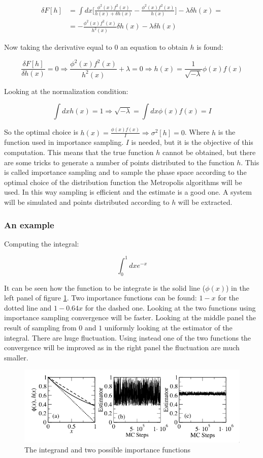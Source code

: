 	\begin{align*}
		\delta F[h] &= \int dx\biggl[\frac{\phi^2(x)f^2(x)}{h(x) + \delta h(x)} - \frac{\phi^2(x)f^2(x)}{h(x)}\biggr]-\lambda\delta h(x)=\\
								&=-\frac{\phi^2(x)f^2(x)}{h^2(x)}\delta h(x)-\lambda\delta h(x)
	\end{align*}

	Now taking the derivative equal to $0$ an equation to obtain $h$ is found:

	$$\frac{\delta F[h]}{\delta h(x)} = 0\Rightarrow\frac{\phi^2(x)f^2(x)}{h^2(x)}+\lambda = 0\Rightarrow h(x) = \frac{1}{\sqrt{-\lambda}}\phi(x)f(x)$$

	Looking at the normalization condition:

	$$\int dxh(x) = 1\Rightarrow\sqrt{-\lambda} = \int dx\phi(x)f(x) = I$$

	So the optimal choice is $h(x) = \frac{\phi(x)f(x)}{I}\Rightarrow \sigma^2[h] =0$.
	Where $h$ is the function used in importance sampling.
	$I$ is needed, but it is the objective of this computation.
	This means that the true function $h$ cannot be obtained, but there are some tricks to generate a number of points distributed to the function $h$.
	This is called importance sampling and to sample the phase space according to the optimal choice of the distribution function the Metropolis algorithms will be used.
	In this way sampling is efficient and the estimate is a good one.
	A system will be simulated and points distributed according to $h$ will be extracted.

		\subsubsection{An example}
		Computing the integral:

		$$\int_0^1 dxe^{-x}$$

		It can be seen how the function to be integrate is the solid line ($\phi(x)$) in the left panel of figure \ref{fig:importance-sampling-example}.
		Two importance functions can be found: $1-x$ for the dotted line and $1-0.64x$ for the dashed one.
		Looking at the two functions using importance sampling convergence will be faster.
		Looking at the middle panel the result of sampling from $0$ and $1$ uniformly looking at the estimator of the integral.
		There are huge fluctuation.
		Using instead one of the two functions the convergence will be improved as in the right panel the fluctuation are much smaller.

		\begin{figure}[h]
			\includegraphics[width=\textwidth]{importance-sampling}
			\caption{The integrand and two possible importance functions}
			\label{fig:importance-sampling-example}
		\end{figure}

